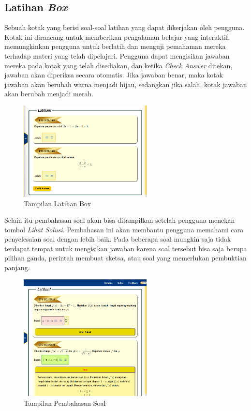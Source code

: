 \documentclass{file/KP-ITS}
\theoremstyle{definition}
\theoremstyle{definition}
\theoremstyle{plain}
\begin{document}
\subsection{Latihan \textit{Box}}
  Sebuah kotak yang berisi soal-soal latihan yang dapat dikerjakan oleh pengguna. Kotak ini dirancang untuk memberikan pengalaman belajar yang interaktif, memungkinkan pengguna untuk berlatih dan menguji pemahaman mereka terhadap materi yang telah dipelajari. Pengguna dapat mengisikan jawaban mereka pada kotak yang telah disediakan, dan ketika \textit{Check Answer} ditekan, jawaban akan diperiksa secara otomatis. Jika jawaban benar, maka kotak jawaban akan berubah warna menjadi hijau, sedangkan jika salah, kotak jawaban akan berubah menjadi merah.
\begin{figure}[h!]
    \centering
    \includegraphics[width=0.6\textwidth]{foto/LatihanBox.png}
    \caption{Tampilan Latihan Box}
\end{figure}

  Selain itu pembahasan soal akan bisa ditampilkan setelah pengguna menekan tombol \textit{Lihat Solusi}. Pembahasan ini akan membantu pengguna memahami cara penyelesaian soal dengan lebih baik. Pada beberapa soal mungkin saja tidak terdapat tempat untuk mengisikan jawaban karena soal tersebut bisa saja berupa pilihan ganda, perintah membuat sketsa, atau soal yang memerlukan pembuktian panjang.
  \begin{figure}[h!]
    \centering
    \includegraphics[width=0.6\textwidth]{foto/LihatSolusi.png}
    \caption{Tampilan Pembahasan Soal}
  \end{figure}
\end{document}
